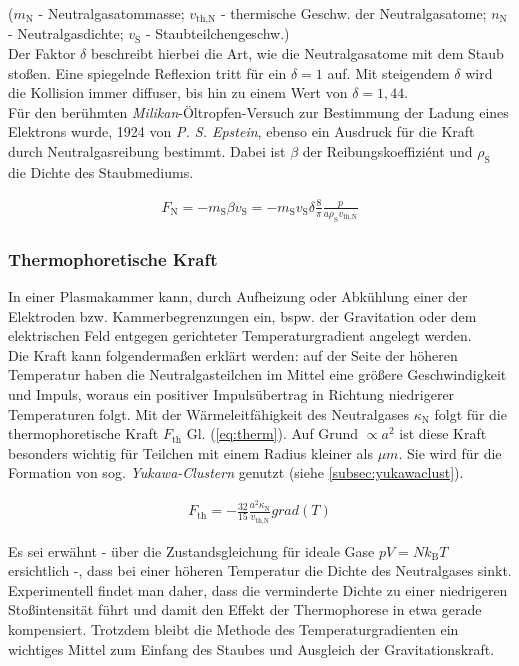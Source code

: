 \documentclass[numbers=noenddot,a4paper]{scrartcl}
\newcommand{\ix}[1]{_\text{#1}}
\newcommand{\tilt}[1]{\textit{#1}}
\newcommand{\grad}[1]{\textit{grad}\left(#1\right)}
\begin{document}
				($m\ix{N}$ - Neutralgasatommasse; $v\ix{th,N}$ - thermische Geschw. der Neutralgasatome; $n\ix{N}$ - Neutralgasdichte; $v\ix{S}$ - Staubteilchengeschw.)\\
				Der Faktor $\delta$ beschreibt hierbei die Art, wie die Neutralgasatome mit dem Staub stoßen. Eine spiegelnde Reflexion tritt für ein $\delta=1$ auf. Mit steigendem $\delta$ wird die Kollision immer diffuser, bis hin zu einem Wert von $\delta=1,44$.\\
				Für den berühmten \tilt{Milikan}-Öltropfen-Versuch zur Bestimmung der Ladung eines Elektrons wurde, 1924 von \tilt{P. S. Epstein}, ebenso ein Ausdruck für die Kraft durch Neutralgasreibung bestimmt. Dabei ist $\beta$ der Reibungskoeffiziént und $\rho\ix{S}$ die Dichte des Staubmediums.
				
					\begin{align}
						F\ix{N}=-m\ix{S}\beta v\ix{S}=-m\ix{S}v\ix{S}\delta\frac{8}{\pi}\frac{p}{a\rho\ix{S}v\ix{th,N}}
					\end{align}
					
			\subsubsection{Thermophoretische Kraft}\label{subsub:therm}
	
				In einer Plasmakammer kann, durch Aufheizung oder Abkühlung einer der Elektroden bzw. Kammerbegrenzungen ein, bspw. der Gravitation oder dem elektrischen Feld entgegen gerichteter Temperaturgradient angelegt werden.\\
				Die Kraft kann folgendermaßen erklärt werden: auf der Seite der höheren Temperatur haben die Neutralgasteilchen im Mittel eine größere Geschwindigkeit und Impuls, woraus ein positiver Impulsübertrag in Richtung niedrigerer Temperaturen folgt.	Mit der Wärmeleitfähigkeit des Neutralgases $\kappa\ix{N}$ folgt für die thermophoretische Kraft $F\ix{th}$ Gl. (\ref{eq:therm}). Auf Grund $\propto a^2$ ist diese Kraft besonders wichtig für Teilchen mit einem Radius kleiner als $\unit{\mu m}$. Sie wird für die Formation von sog. \tilt{Yukawa-Clustern} genutzt (siehe \ref{subsec:yukawaclust}).
				
					\begin{align}
						F\ix{th}=-\frac{32}{15}\frac{a^2 \kappa\ix{N}}{v\ix{th,N}}\grad{T} \label{eq:therm}
					\end{align}
					
				Es sei erwähnt -  über die Zustandsgleichung für ideale Gase $pV=Nk\ix{B}T$ ersichtlich -, dass bei einer höheren Temperatur die Dichte des Neutralgases sinkt. Experimentell findet man daher, dass die verminderte Dichte zu einer niedrigeren Stoßintensität führt und damit den Effekt der Thermophorese in etwa gerade kompensiert. Trotzdem bleibt die Methode des Temperaturgradienten ein wichtiges Mittel zum Einfang des Staubes und Ausgleich der Gravitationskraft.
					
\end{document}
